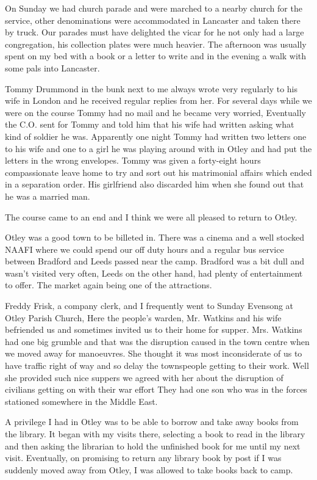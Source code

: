 On Sunday we had church parade and were marched to a nearby church for
the service, other denominations were accommodated in Lancaster and
taken there by truck. Our parades must have delighted the vicar for he
not only had a large congregation, his collection plates were much
heavier. The afternoon was usually spent on my bed with a book or a
letter to write and in the evening a walk with some pals into
Lancaster.

Tommy Drummond in the bunk next to me always wrote very regularly to
his wife in London and he received regular replies from her. For
several days while we were on the course Tommy had no mail and he
became very worried, Eventually the C.O. sent for Tommy and told him
that his wife had written asking what kind of soldier he
was. Apparently one night Tommy had written two letters one to his
wife and one to a girl he was playing around with in Otley and had put
the letters in the wrong envelopes. Tommy was given a forty-eight
hours compassionate leave home to try and sort out his matrimonial
affairs which ended in a separation order. His girlfriend also
discarded him when she found out that he was a married man.

The course came to an end and I think we were all pleased to return to
Otley.

Otley was a good town to be billeted in. There was a cinema and a well
stocked NAAFI where we could spend our off duty hours and a regular
bus service between Bradford and Leeds passed near the camp. Bradford
was a bit dull and wasn't visited very often, Leeds on the other hand,
had plenty of entertainment to offer. The market again being one of
the attractions.

Freddy Frisk, a company clerk, and I frequently went to Sunday
Evensong at Otley Parish Church, Here the people's warden, Mr. Watkins
and his wife befriended us and sometimes invited us to their home for
supper. Mrs. Watkins had one big grumble and that was the disruption
caused in the town centre when we moved away for manoeuvres. She
thought it was most inconsiderate of us to have traffic right of way
and so delay the townspeople getting to their work. Well she provided
such nice suppers we agreed with her about the disruption of civilians
getting on with their war effort They had one son who was in the
forces stationed somewhere in the Middle East. 

A privilege I had in Otley was to be able to borrow and take away
books from the library. It began with my visits there, selecting a
book to read in the library and then asking the librarian to hold the
unfinished book for me until my next visit. Eventually, on promising
to return any library book by post if I was suddenly moved away from
Otley, I was allowed to take books back to camp.

